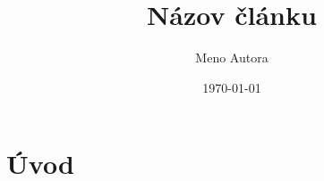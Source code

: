 \documentclass[12pt,a4paper,oneside,openany]{article}
\title{Názov článku}
\author{Meno Autora}
\date{\today}
\begin{document}
\pagestyle{frontpage}
\maketitle

\pagestyle{default}

\section{Úvod}


\cite{Kikimor2008}




\end{document}
